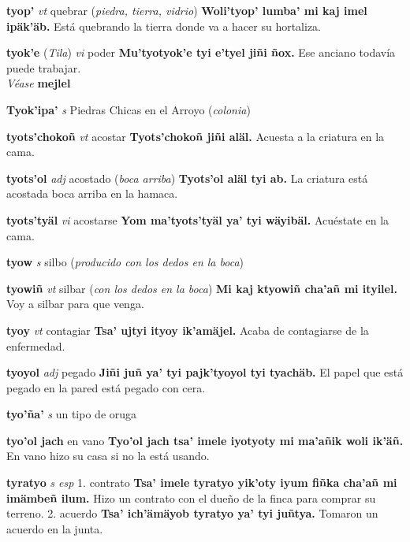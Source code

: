 \documentclass[10pt]{scrbook}
\newcommand{\entry}[1]{\textbf{#1}}
\newcommand{\onedefinition}[1]{#1.}
\newcommand{\partofspeech}[1]{\textit{#1}}
\newcommand{\spanishtranslation}[1]{#1}
\newcommand{\clarification}[1]{(\textit{#1})}
\newcommand{\cholexample}[1]{\textbf{#1}}
\newcommand{\exampletranslation}[1]{#1}
\newcommand{\alsosee}[1]{\\\textit{Véase} \textbf{#1}}
\newcommand{\relevantdialect}[1]{(\textit{#1})}
\begin{document}
\begin{multicols}{2}
\entry{tyop'}
\partofspeech{vt}
\spanishtranslation{quebrar}
\clarification{piedra, tierra, vidrio}
\cholexample{Woli'tyop' lumba' mi kaj imel ipäk'äb.}
\exampletranslation{Está quebrando la tierra donde va a hacer su hortaliza.}

\entry{tyok'e}
\relevantdialect{Tila}
\partofspeech{vi}
\spanishtranslation{poder}
\cholexample{Mu'tyotyok'e tyi e'tyel jiñi ñox.}
\exampletranslation{Ese anciano todavía puede trabajar.}
\alsosee{mejlel}

\entry{Tyok'ipa'}
\partofspeech{s}
\spanishtranslation{Piedras Chicas en el Arroyo}
\clarification{colonia}

\entry{tyots'chokoñ}
\partofspeech{vt}
\spanishtranslation{acostar}
\cholexample{Tyots'chokoñ jiñi aläl.}
\exampletranslation{Acuesta a la criatura en la cama.}

\entry{tyots'ol}
\partofspeech{adj}
\spanishtranslation{acostado}
\clarification{boca arriba}
\cholexample{Tyots'ol aläl tyi ab.}
\exampletranslation{La criatura está acostada boca arriba en la hamaca.}

\entry{tyots'tyäl}
\partofspeech{vi}
\spanishtranslation{acostarse}
\cholexample{Yom ma'tyots'tyäl ya' tyi wäyibäl.}
\exampletranslation{Acuéstate en la cama.}

\entry{tyow}
\partofspeech{s}
\spanishtranslation{silbo}
\clarification{producido con los dedos en la boca}

\entry{tyowiñ}
\partofspeech{vt}
\spanishtranslation{silbar}
\clarification{con los dedos en la boca}
\cholexample{Mi kaj ktyowiñ cha'añ mi ityilel.}
\exampletranslation{Voy a silbar para que venga.}

\entry{tyoy}
\partofspeech{vt}
\spanishtranslation{contagiar}
\cholexample{Tsa' ujtyi ityoy ik'amäjel.}
\exampletranslation{Acaba de contagiarse de la enfermedad.}

\entry{tyoyol}
\partofspeech{adj}
\spanishtranslation{pegado}
\cholexample{Jiñi juñ ya' tyi pajk'tyoyol tyi tyachäb.}
\exampletranslation{El papel que está pegado en la pared está pegado con cera.}

\entry{tyo'ña'}
\partofspeech{s}
\spanishtranslation{un tipo de oruga}

\entry{tyo'ol jach}
\spanishtranslation{en vano}
\cholexample{Tyo'ol jach tsa' imele iyotyoty mi ma'añik woli ik'äñ.}
\exampletranslation{En vano hizo su casa si no la está usando.}

\entry{tyratyo}
\partofspeech{s esp}
\onedefinition{1}
\spanishtranslation{contrato}
\cholexample{Tsa' imele tyratyo yik'oty iyum fiñka cha'añ mi imämbeñ ilum.}
\exampletranslation{Hizo un contrato con el dueño de la finca para comprar su terreno.}
\onedefinition{2}
\spanishtranslation{acuerdo}
\cholexample{Tsa' ich'ämäyob tyratyo ya' tyi juñtya.}
\exampletranslation{Tomaron un acuerdo en la junta.}


\end{multicols}
\end{document}
